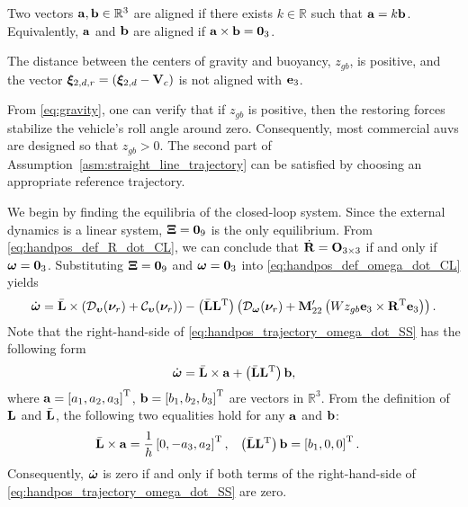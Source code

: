 \begin{dfn}
    Two vectors $\mathbf{a}, \mathbf{b} \in \mathbb{R}^3$ are aligned if there exists $k \in \mathbb{R}$ such that $\mathbf{a} = k\mathbf{b}$.
    Equivalently, $\mathbf{a}$ and $\mathbf{b}$ are aligned if $\mathbf{a} \times \mathbf{b} = \mathbf{0}_3$.
    \label{dfn:aligned}
\end{dfn}
\begin{asm}
    The distance between the centers of gravity and buoyancy, $z_{gb}$, is positive, and the vector $\bm{\xi}_{2, d, r} = (\bm{\xi}_{2, d} - \mathbf{V}_c)$ is not aligned with $\mathbf{e}_3$.
    \label{asm:straight_line_trajectory}
\end{asm}
\begin{rmk*}
    From \eqref{eq:gravity}, one can verify that if $z_{gb}$ is positive, then the restoring forces stabilize the vehicle's roll angle around zero.
    Consequently, most commercial \glspl{auv} are designed so that $z_{gb} > 0$.
    The second part of Assumption~\ref{asm:straight_line_trajectory} can be satisfied by choosing an appropriate reference trajectory.
\end{rmk*}

We begin by finding the equilibria of the closed-loop system.
Since the external dynamics is a linear system, $\bm{\Xi} = \mathbf{0}_9$ is the only equilibrium.
From \eqref{eq:handpos_def_R_dot_CL}, we can conclude that $\dot{\mathbf{R}} = \mathbf{O}_{3 \times 3}$ if and only if $\bm{\omega} = \mathbf{0}_3$.
Substituting $\bm{\Xi} = \mathbf{0}_9$ and $\bm{\omega} = \mathbf{0}_3$ into \eqref{eq:handpos_def_omega_dot_CL} yields
\begin{equation}
        \dot{\bm{\omega}} = \Bar{\mathbf{L}} \times \left(\mathcal{D}_{\bm{\upsilon}}(\bm{\nu}_r) + \mathcal{C}_{\bm{\upsilon}}(\bm{\nu}_r)\right) 
        - \left(\Bar{\mathbf{L}}\mathbf{L}^{\mathrm{T}}\right) \left(\mathcal{D}_{\bm{\omega}}(\bm{\nu}_r) + \mathbf{M}_{22}^{\prime}\left(Wz_{gb} \mathbf{e}_3 \times \mathbf{R}^{\mathrm{T}} \mathbf{e}_3\right)\right).
    \label{eq:handpos_trajectory_omega_dot_SS}
\end{equation}
Note that the right-hand-side of \eqref{eq:handpos_trajectory_omega_dot_SS} has the following form
\begin{equation}
    \dot{\bm{\omega}} = \Bar{\mathbf{L}} \times \mathbf{a} + \left(\Bar{\mathbf{L}}\mathbf{L}^{\mathrm{T}}\right) \mathbf{b},
\end{equation}
where $\mathbf{a} = \left[a_1, a_2, a_3\right]^{\mathrm{T}}$, $\mathbf{b} = \left[b_1, b_2, b_3\right]^{\mathrm{T}}$ are vectors in $\mathbb{R}^3$.
From the definition of $\mathbf{L}$ and $\Bar{\mathbf{L}}$, the following two equalities hold for any $\mathbf{a}$ and $\mathbf{b}$:
\begin{align}
    \Bar{\mathbf{L}} \times \mathbf{a} &= \frac{1}{h} \left[0, -a_3, a_2\right]^{\mathrm{T}}, &
    \left(\Bar{\mathbf{L}}\mathbf{L}^{\mathrm{T}}\right) \mathbf{b} &= \left[b_1, 0, 0\right]^{\mathrm{T}}.
\end{align}
Consequently, $\dot{\bm{\omega}}$ is zero if and only if both terms of the right-hand-side of \eqref{eq:handpos_trajectory_omega_dot_SS} are zero.

